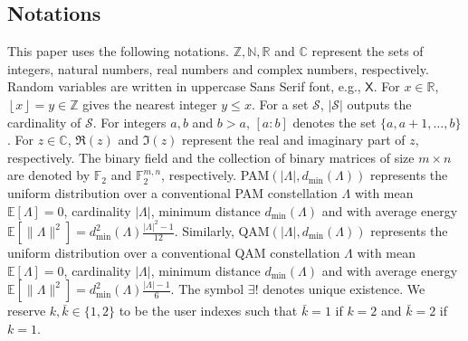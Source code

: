 \documentclass[12pt, draftclsnofoot, onecolumn]{IEEEtran}
\newcommand{\msf}[1]{\mathsf{#1}}
\newcommand{\E}{\mathbb{E}}
\theoremstyle{definition}
\begin{document}
\subsection{Notations}
This paper uses the following notations. $\mathbb{Z},\mathbb{N},\mathbb{R}$ and $\mathbb{C}$ represent the sets of integers, natural numbers, real numbers and complex numbers, respectively. Random variables are written in uppercase Sans Serif font, e.g., $\msf{X}$. For $x\in\mathbb{R}$, $\left\lfloor x\right\rfloor = y \in \mathbb{Z}$ gives the nearest integer $y\leq x$. For a set $\mathcal{S}$, $|\mathcal{S}|$ outputs the cardinality of $\mathcal{S}$. For integers $a,b$ and $b>a$, $[a:b]$ denotes the set $\{a, a+1,\ldots, b\}$. For $z \in \mathbb{C}$, $\Re(z)$ and $\Im(z)$ represent the real and imaginary part of $z$, respectively. The binary field and the collection of binary matrices of size $m\times n$ are denoted by $\mathbb{F}_2$ and $\mathbb{F}_2^{m,n}$, respectively. PAM$(|\Lambda|,d_{\min}(\Lambda))$ represents the uniform distribution over a conventional PAM constellation $\Lambda$ with mean $\mathbb{E}[\Lambda] = 0$, cardinality $|\Lambda|$, minimum distance $d_{\min}(\Lambda)$ and with average energy $\E[\| \Lambda\|^2] = d_{\min}^2(\Lambda)\frac{|\Lambda|^2-1}{12}$. Similarly, QAM$(|\Lambda|,d_{\min}(\Lambda))$ represents the uniform distribution over a conventional QAM constellation $\Lambda$ with mean $\mathbb{E}[\Lambda] = 0$, cardinality $|\Lambda|$, minimum distance $d_{\min}(\Lambda)$ and with average energy $\E[\| \Lambda\|^2] = d_{\min}^2(\Lambda)\frac{|\Lambda|-1}{6}$. The symbol $\exists!$ denotes unique existence. We reserve $k,\bar{k} \in \{1,2\}$ to be the user indexes such that $\bar{k}=1$ if $k=2$ and $\bar{k}=2$ if $k=1$.
\end{document}
